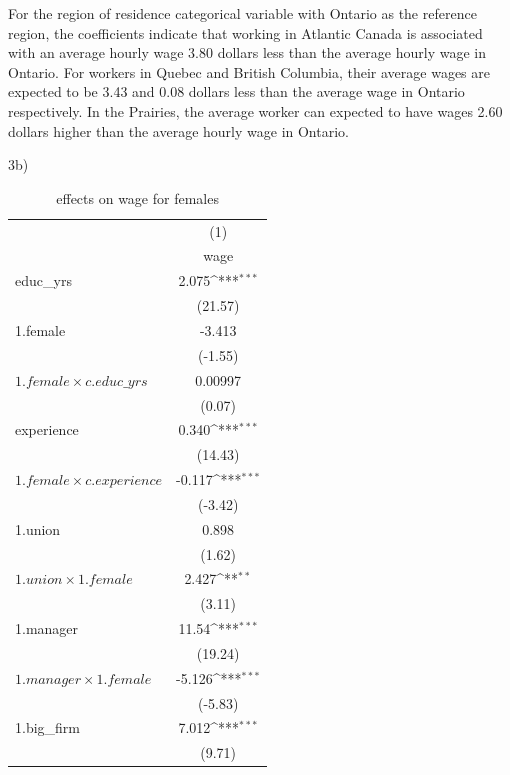 \documentclass[11pt]{article}
\begin{document}
For the region of residence categorical variable with Ontario as the reference region, the coefficients indicate that working in Atlantic Canada is associated with an average hourly wage 3.80 dollars less than the average hourly wage in Ontario. For workers in Quebec and British Columbia, their average wages are expected to be 3.43 and 0.08 dollars less than the average wage in Ontario respectively. In the Prairies, the average worker can expected to have wages 2.60 dollars higher than the average hourly wage in Ontario. 

3b)

{
\begin{table}[!ht]
\caption{effects on wage for females}
\centering
\def\sym#1{\ifmmode^{#1}\else\(^{#1}\)\fi}
\begin{tabular}{l*{1}{c}}
\hline\hline
            &\multicolumn{1}{c}{(1)}\\
            &\multicolumn{1}{c}{wage}\\
\hline
educ\_yrs    &       2.075\sym{***}\\
            &     (21.57)         \\
[1em]
1.female    &      -3.413         \\
            &     (-1.55)         \\
[1em]
$1.female\times c.educ\_yrs$&     0.00997         \\
            &      (0.07)         \\
[1em]
experience  &       0.340\sym{***}\\
            &     (14.43)         \\
[1em]
$1.female\times c.experience$&   -0.117\sym{***}\\
            & (-3.42)         \\
[1em]
1.union     &  0.898         \\
            &  (1.62)         \\
[1em]
$1.union\times 1.female$&  2.427\sym{**} \\
            &   (3.11)         \\
[1em]
1.manager   &   11.54\sym{***}\\
            &   (19.24)         \\
[1em]
$1.manager\times 1.female$&   -5.126\sym{***}\\
            &        (-5.83)         \\
[1em]
1.big\_firm  &  7.012\sym{***}\\
            &    (9.71)         \\

\end{tabular}
\end{table}}
\end{document}
